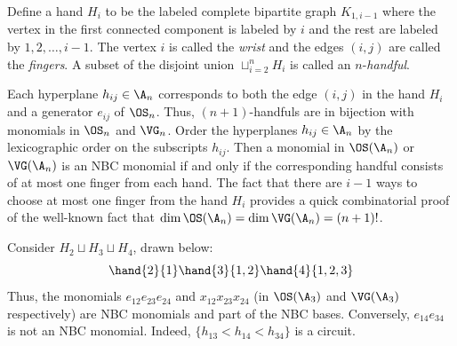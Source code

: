 \documentclass{amsart}
\begin{document}
\begin{definition}\label{def:HandsFingers}
    Define a hand $H_i$ to be the labeled complete bipartite graph $K_{1,i-1}$ where the vertex in the first connected component is labeled by $i$ and the rest are labeled by $1,2,\ldots,i-1$.
    The vertex $i$ is called the \textit{wrist} and the edges $(i,j)$ are called the \textit{fingers}.
    A subset of the disjoint union $\sqcup_{i=2}^n H_i$ is called an $n$-\textit{handful}.
\end{definition}

Each hyperplane $h_{ij} \in \A_n$ corresponds to both the edge $(i,j)$ in the hand $H_i$ and a generator $e_{ij}$ of $\OS_n$.
Thus, $(n+1)$-handfuls are in bijection with monomials in $\OS_n$ and $\VG_n$.
Order the hyperplanes $h_{ij} \in \A_n$ by the lexicographic order on the subscripts $h_{ij}$.
Then a monomial in $\OS(\A_n)$ or $\VG(\A_n)$ is an NBC monomial if and only if the corresponding handful consists of at most one finger from each hand.
The fact that there are $i-1$ ways to choose at most one finger from the hand $H_i$ provides a quick combinatorial proof of the well-known fact that $\dim \OS(\A_n) = \dim \VG(\A_n) = (n+1)!$.

\begin{example}
    Consider $H_2 \sqcup H_3 \sqcup H_4$, drawn below:
    \[\hand{2}{1} \hand{3}{1,2} \hand{4}{1,2,3}\]
    Thus, the monomials $e_{12}e_{23}e_{24}$ and $x_{12}x_{23}x_{24}$ (in $\OS(\A_3)$ and $\VG(\A_3)$ respectively) are NBC monomials and part of the NBC bases.
    Conversely, $e_{14}e_{34}$ is not an NBC monomial.
    Indeed, $\{h_{13} < h_{14} < h_{34}\}$ is a circuit.
\end{example}
\end{document}
